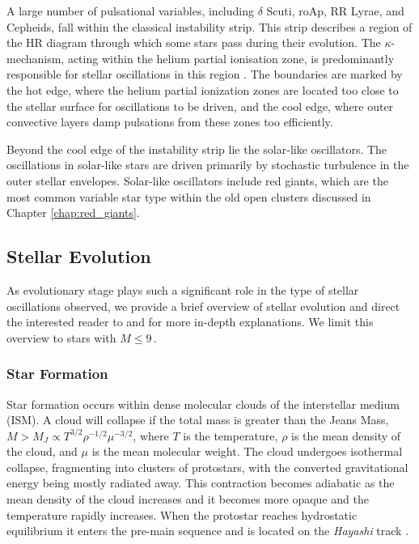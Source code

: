 A large number of pulsational variables, including $\delta$ Scuti, roAp, RR Lyrae, and Cepheids, fall within the classical instability strip. This strip describes a region of the HR diagram through which some stars pass during their evolution. The $\kappa$-mechanism, acting within the helium partial ionisation zone, is predominantly responsible for stellar oscillations in this region \citep{king_pulsating_1968}. The boundaries are marked by the hot edge, where the helium partial ionization zones are located too close to the stellar surface for oscillations to be driven, and the cool edge, where outer convective layers damp pulsations from these zones too efficiently.

Beyond the cool edge of the instability strip lie the solar-like oscillators. The oscillations in solar-like stars are driven primarily by stochastic turbulence in the outer stellar envelopes. Solar-like oscillators include red giants, which are the most common variable star type within the old open clusters discussed in Chapter \ref{chap:red_giants}.

\subsection{Stellar Evolution}

As evolutionary stage plays such a significant role in the type of stellar oscillations observed, we provide a brief overview of stellar evolution and direct the interested reader to \cite{kippenhahn_stellar_2012} and \cite{christensen-dalsgaard_stellar_2002} for more in-depth explanations. We limit this overview to stars with $M \leq 9$\,\Msol.

\subsubsection{Star Formation}

Star formation occurs within dense molecular clouds of the interstellar medium (ISM). A cloud will collapse if the total mass is greater than the Jeans Mass, $M > M_J \propto T^{3/2} \rho^{-1/2} \mu^{-3/2}$, where $T$ is the temperature, $\rho$ is the mean density of the cloud, and $\mu$ is the mean molecular weight. The cloud undergoes isothermal collapse, fragmenting into clusters of protostars, with the converted gravitational energy being mostly radiated away. This contraction becomes adiabatic as the mean density of the cloud increases and it becomes more opaque and the temperature rapidly increases. When the protostar reaches hydrostatic equilibrium it enters the pre-main sequence and is located on the {\em Hayashi} track \citep{hayashi_stellar_1961}.

